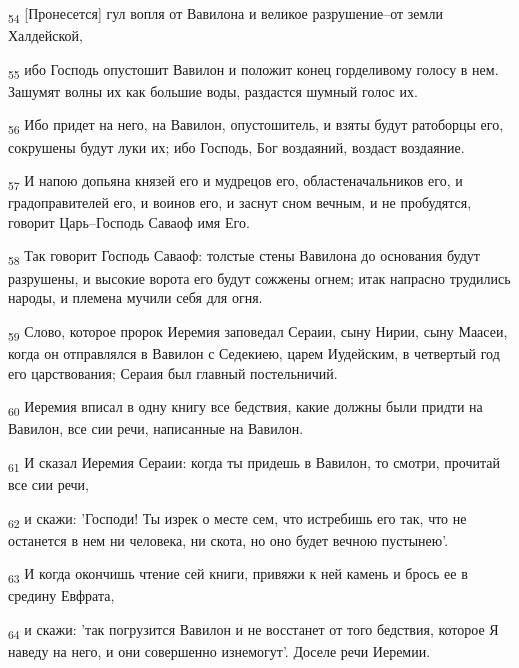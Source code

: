 \begin{tcolorbox}
\textsubscript{54} [Пронесется] гул вопля от Вавилона и великое разрушение--от земли Халдейской,
\end{tcolorbox}
\begin{tcolorbox}
\textsubscript{55} ибо Господь опустошит Вавилон и положит конец горделивому голосу в нем. Зашумят волны их как большие воды, раздастся шумный голос их.
\end{tcolorbox}
\begin{tcolorbox}
\textsubscript{56} Ибо придет на него, на Вавилон, опустошитель, и взяты будут ратоборцы его, сокрушены будут луки их; ибо Господь, Бог воздаяний, воздаст воздаяние.
\end{tcolorbox}
\begin{tcolorbox}
\textsubscript{57} И напою допьяна князей его и мудрецов его, областеначальников его, и градоправителей его, и воинов его, и заснут сном вечным, и не пробудятся, говорит Царь--Господь Саваоф имя Его.
\end{tcolorbox}
\begin{tcolorbox}
\textsubscript{58} Так говорит Господь Саваоф: толстые стены Вавилона до основания будут разрушены, и высокие ворота его будут сожжены огнем; итак напрасно трудились народы, и племена мучили себя для огня.
\end{tcolorbox}
\begin{tcolorbox}
\textsubscript{59} Слово, которое пророк Иеремия заповедал Сераии, сыну Нирии, сыну Маасеи, когда он отправлялся в Вавилон с Седекиею, царем Иудейским, в четвертый год его царствования; Сераия был главный постельничий.
\end{tcolorbox}
\begin{tcolorbox}
\textsubscript{60} Иеремия вписал в одну книгу все бедствия, какие должны были придти на Вавилон, все сии речи, написанные на Вавилон.
\end{tcolorbox}
\begin{tcolorbox}
\textsubscript{61} И сказал Иеремия Сераии: когда ты придешь в Вавилон, то смотри, прочитай все сии речи,
\end{tcolorbox}
\begin{tcolorbox}
\textsubscript{62} и скажи: 'Господи! Ты изрек о месте сем, что истребишь его так, что не останется в нем ни человека, ни скота, но оно будет вечною пустынею'.
\end{tcolorbox}
\begin{tcolorbox}
\textsubscript{63} И когда окончишь чтение сей книги, привяжи к ней камень и брось ее в средину Евфрата,
\end{tcolorbox}
\begin{tcolorbox}
\textsubscript{64} и скажи: 'так погрузится Вавилон и не восстанет от того бедствия, которое Я наведу на него, и они совершенно изнемогут'. Доселе речи Иеремии.
\end{tcolorbox}
